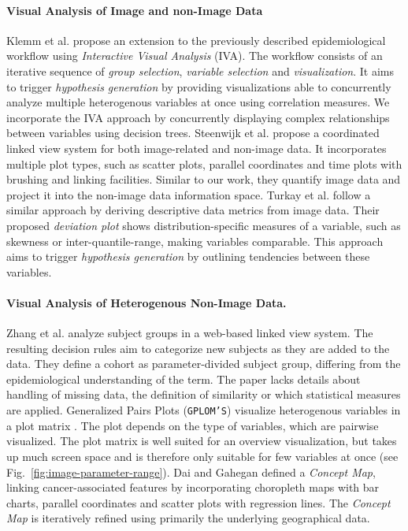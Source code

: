 \documentclass[a4paper,twoside]{style/article}
\begin{document}
\paragraph{Visual Analysis of Image and non-Image Data}
Klemm et al. \cite{Klemm2014VIS} propose an extension to the previously described epidemiological workflow using \emph{Interactive Visual Analysis} (IVA).
The workflow consists of an iterative sequence of \emph{group selection}, \emph{variable selection} and \emph{visualization}.
It aims to trigger \emph{hypothesis generation} by providing visualizations able to concurrently analyze multiple heterogenous variables at once using correlation measures.
We incorporate the IVA approach by concurrently displaying complex relationships between variables using decision trees.
Steenwijk et al. \cite{Steenwijk} propose a coordinated linked view system for both image-related and non-image data.
It incorporates multiple plot types, such as scatter plots, parallel coordinates and time plots with brushing and linking facilities.
Similar to our work, they quantify image data and project it into the non-image data information space.
Turkay et al. \cite{Turkay} follow a similar approach by deriving descriptive data metrics from image data.
Their proposed \emph{deviation plot} shows distribution-specific measures of a variable, such as skewness or inter-quantile-range, making variables comparable.
This approach aims to trigger \emph{hypothesis generation} by outlining tendencies between these variables.
\paragraph{Visual Analysis of Heterogenous Non-Image Data.}
Zhang et al. \cite{Zhang} analyze subject groups in a web-based linked view system.
The resulting decision rules aim to categorize new subjects as they are added to the data.
They define a cohort as parameter-divided subject group, differing from the epidemiological understanding of the term.
The paper lacks details about handling of missing data, the definition of similarity or which statistical measures are applied.
Generalized Pairs Plots (\texttt{GPLOM'S}) visualize heterogenous variables in a plot matrix \cite{GPLOMS,Francois}.
The plot depends on the type of variables, which are pairwise visualized.
The plot matrix is well suited for an overview visualization, but takes up much screen space and is therefore only suitable for few variables at once (see Fig.~\ref{fig:image-parameter-range}).
Dai and Gahegan \cite{Dai} defined a \emph{Concept Map}, linking cancer-associated features by incorporating choropleth maps with bar charts, parallel coordinates and scatter plots with regression lines.
The \emph{Concept Map} is iteratively refined using primarily the underlying geographical data.
\end{document}

